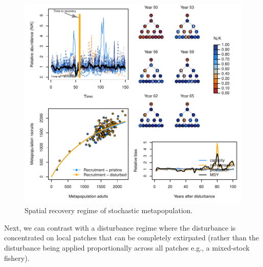\documentclass[]{article}
\begin{document}
\begin{figure}[H]

{\centering \includegraphics{Managing_for_ecological_surprises_in_metapopulations_files/figure-latex/example results3-1} 

}

\caption{Spatial recovery regime of stochastic metapopulation.}\label{fig:example results3}
\end{figure}
\newpage

Next, we can contrast with a disturbance regime where the disturbance is
concentrated on local patches that can be completely extirpated (rather
than the disturbance being applied proportionally across all patches
e.g., a mixed-stock fishery).
\end{document}
